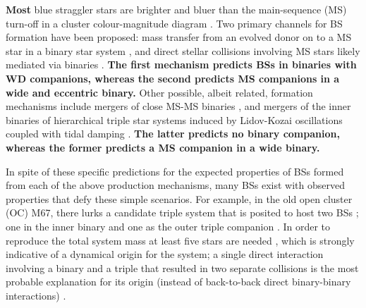 \documentclass[twocolumn]{aastex62}
\begin{document}
\textbf{Most} blue straggler stars are brighter and bluer than the main-sequence
(MS) turn-off in a cluster colour-magnitude diagram
\citep[e.g.][]{1953AJ.....58...61S,1989AJ.....98..217L,2014ApJ...782...49S}.
Two primary channels for BS formation have been proposed: mass
transfer from an evolved donor on to a MS star in a binary star system
\citep[e.g.][]{1964MNRAS.128..147M,1997A&A...328..143P,2009Natur.457..288K,2011MNRAS.410.2370L,2011Natur.478..356G},
and direct stellar collisions involving MS stars likely mediated via
binaries
\citep[e.g.][]{1975AJ.....80..809H,1997A&A...328..130P,2007ApJ...661..210L,2013MNRAS.428..897L,2013MNRAS.429.1221H, 2019A&A...621L..10P}.
\textbf{The first mechanism predicts BSs in binaries with WD companions,
whereas the second predicts MS companions in a wide and eccentric
binary.}  Other possible, albeit related, formation mechanisms include
mergers of close MS-MS binaries \citep{2019A&A...621L..10P}, and
mergers of the inner binaries of hierarchical triple star systems
induced by Lidov-Kozai oscillations coupled with tidal damping
\citep[e.g.][]{2009ApJ...697.1048P}.  \textbf{The latter predicts no binary companion, whereas the former predicts a MS companion in a wide binary.}

In spite of these specific predictions for the expected properties of
BSs formed from each of the above production mechanisms, many BSs
exist with observed properties that defy these simple scenarios.  For
example, in the old open cluster (OC) M67, there lurks a candidate triple
system that is posited to host two BSs
\citep{2001A&A...375..375V,2003AJ....125..810S}; one in the inner binary and one as the outer triple companion \citep{2003AJ....125..810S,2001A&A...375..375V}.  
In order to reproduce the total system mass 
at least five stars are needed \citep{2011MNRAS.410.2370L}, which is strongly indicative of a
dynamical origin for the system; a single direct interaction
involving a binary and a triple that resulted in two separate
collisions is the most probable explanation for its origin
(instead of back-to-back direct binary-binary interactions)
\citep{2004MNRAS.350..615G,2011MNRAS.410.2370L}.  
\end{document}
